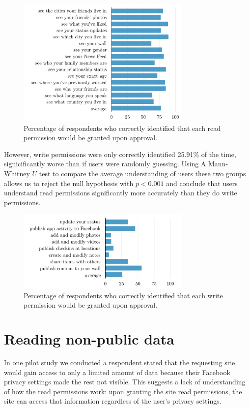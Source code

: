\documentclass[twoside,letterpaper]{soups-poster}
\begin{document}
\begin{figure}[tbh]
  \centering
  \includegraphics[width=8.5cm]{read_percents_cosn}
  \caption{Percentage of respondents who correctly identified that each read permission would be granted upon approval.}
  \label{figure:readpercents}
\end{figure}

\clearpage

However, write permissions were only correctly identified 25.91\% of the time, signicificantly worse than if users were randomly guessing.
Using A Mann-Whitney $U$ test to compare the average understanding of users these two groups allows us to reject the null hypothesis with $p < 0.001$ and conclude that users understand read permissions significantly more accurately than they do write permissions.

\begin{figure}[t!]
  \centering
  \includegraphics[width=8.5cm]{write_percents_cosn}
  \caption{Percentage of respondents who correctly identified that each write permission would be granted upon approval.}
  \label{figure:writepercents}
\end{figure}

\section{Reading non-public data}

In one pilot study we conducted a respondent stated that the requesting site would gain access to only a limited amount of data because their Facebook privacy settings made the rest not visible.
This suggests a lack of understanding of how the read permissions work: upon granting the site read permissions, the site can access that information regardless of the user's privacy settings.
\end{document}
